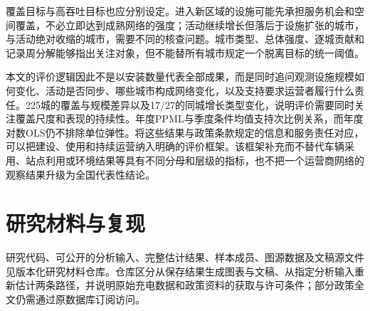 覆盖目标与高吞吐目标也应分别设定。进入新区域的设施可能先承担服务机会和空间覆盖，不必立即达到成熟网络的强度；活动继续增长但落后于设施扩张的城市，与活动绝对收缩的城市，需要不同的核查问题。城市类型、总体强度、逐城贡献和记录周分解能够指出关注对象，但不能替所有城市规定一个脱离目标的统一阈值。

本文的评价逻辑因此不是以安装数量代表全部成果，而是同时追问观测设施规模如何变化、活动是否同步、哪些城市构成网络变化，以及支持要求运营者履行什么责任。225城的覆盖与规模差异以及17/27的同城增长类型变化，说明评价需要同时关注覆盖尺度和表现的持续性。年度PPML与季度条件均值支持次比例关系，而年度对数OLS仍不排除单位弹性。将这些结果与政策条款规定的信息和服务责任对应，可以把建设、使用和持续运营纳入明确的评价框架。该框架补充而不替代车辆采用、站点利用或环境结果等具有不同分母和层级的指标，也不把一个运营商网络的观察结果升级为全国代表性结论。

\section*{研究材料与复现}
研究代码、可公开的分析输入、完整估计结果、样本成员、图源数据及文稿源文件见版本化研究材料仓库\citep{gao2026materials}。仓库区分从保存结果生成图表与文稿、从指定分析输入重新估计两条路径，并说明原始充电数据和政策资料的获取与许可条件；部分政策全文仍需通过原数据库订阅访问。
